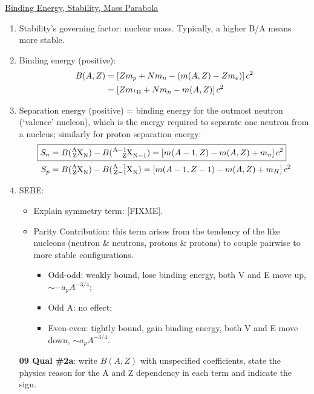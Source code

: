 \documentclass{school-22.101-notes}
\begin{document}
\vspace{1cm}
\uline{Binding Energy, Stability, Mass Parabola}
\begin{enumerate}
\item Stability's governing factor: nuclear mass. Typically, a higher B/A means more stable.
\item Binding energy (positive):
\begin{align} 
B(A,Z) &= \left[ Z m_p + N m_n - (m(A,Z) - Z m_e) \right] c^2 \\
&= \left[ Z m_{\ce{^1 H}} + N m_n - m(A,Z) \right] c^2
\end{align}

\item Separation energy (positive) = binding energy for the outmost neutron (`valence' nucleon), which is the energy required to separate one neutron from a nucleus; similarly for proton separation energy: 
\begin{align}
\Aboxed{ S_n &= B(\ce{^A_Z X_N}) -B(\ce{^{A-1}_Z X_{N-1}}) = \left[ m(A-1, Z) - m(A,Z) + m_n \right] c^2 } \\
S_p &= B(\ce{^A_Z X_N}) -B(\ce{^{A-1}_{Z-1} X_{N}}) = \left[ m(A-1, Z-1) - m(A,Z) + m_{H} \right] c^2
\end{align}

\item SEBE:
    \begin{itemize}
    \item Explain symmetry term: [FIXME]. 
    \item Parity Contribution: this term arises from the tendency of the like nucleons (neutron \& neutrons, protons \& protons) to couple pairwise to more stable configurations.
      \begin{itemize}
      \item Odd-odd: weakly bound, lose binding energy, both V and E move up, $\sim -a_p A^{-3/4}$;
      \item Odd A: no effect;
      \item Even-even: tightly bound, gain binding energy, both V and E move down, $\sim a_p A^{-3/4}$.
      \end{itemize}
    \end{itemize}
    \textbf{09 Qual \#2a}: write $B(A,Z)$ with unspecified coefficients, state the physics reason for the A and Z dependency in each term and indicate the sign.
    

\end{enumerate}
\end{document}
